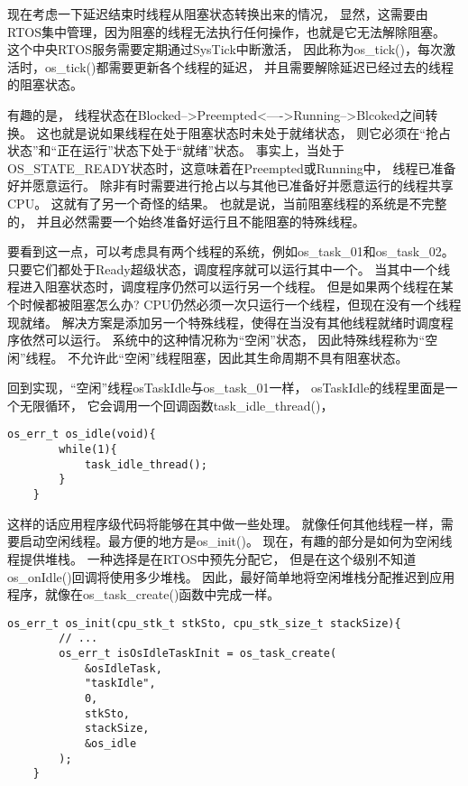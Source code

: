 现在考虑一下延迟结束时线程从阻塞状态转换出来的情况，
显然，这需要由RTOS集中管理，因为阻塞的线程无法执行任何操作，也就是它无法解除阻塞。
这个中央RTOS服务需要定期通过SysTick中断激活，
因此称为os\_tick()，每次激活时，os\_tick()都需要更新各个线程的延迟，
并且需要解除延迟已经过去的线程的阻塞状态。

有趣的是，
线程状态在Blocked-->Preempted<---->Running-->Blcoked之间转换。
这也就是说如果线程在处于阻塞状态时未处于就绪状态，
则它必须在“抢占状态”和“正在运行”状态下处于“就绪”状态。
事实上，当处于OS\_STATE\_READY状态时，这意味着在Preempted或Running中，
线程已准备好并愿意运行。
除非有时需要进行抢占以与其他已准备好并愿意运行的线程共享CPU。
这就有了另一个奇怪的结果。
也就是说，当前阻塞线程的系统是不完整的，
并且必然需要一个始终准备好运行且不能阻塞的特殊线程。

要看到这一点，可以考虑具有两个线程的系统，例如os\_task\_01和os\_task\_02。
只要它们都处于Ready超级状态，调度程序就可以运行其中一个。
当其中一个线程进入阻塞状态时，调度程序仍然可以运行另一个线程。
但是如果两个线程在某个时候都被阻塞怎么办? 
CPU仍然必须一次只运行一个线程，但现在没有一个线程现就绪。
解决方案是添加另一个特殊线程，使得在当没有其他线程就绪时调度程序依然可以运行。
系统中的这种情况称为“空闲”状态，
因此特殊线程称为“空闲”线程。
不允许此“空闲”线程阻塞，因此其生命周期不具有阻塞状态。

回到实现，“空闲”线程osTaskIdle与os\_task\_01一样，
osTaskIdle的线程里面是一个无限循环，
它会调用一个回调函数task\_idle\_thread()，
\begin{lstlisting}[language={[ANSI]C},keywordstyle=\color{blue!70},commentstyle=\color{red!50!green!50!blue!50},frame=shadowbox, rulesepcolor=\color{red!20!green!20!blue!20}]
    os_err_t os_idle(void){
	    while(1){
		    task_idle_thread();
	    }
    }
\end{lstlisting}
这样的话应用程序级代码将能够在其中做一些处理。
就像任何其他线程一样，需要启动空闲线程。最方便的地方是os\_init()。
现在，有趣的部分是如何为空闲线程提供堆栈。
一种选择是在RTOS中预先分配它，
但是在这个级别不知道os\_onIdle()回调将使用多少堆栈。
因此，最好简单地将空闲堆栈分配推迟到应用程序，就像在os\_task\_create()函数中完成一样。
\begin{lstlisting}[language={[ANSI]C},keywordstyle=\color{blue!70},commentstyle=\color{red!50!green!50!blue!50},frame=shadowbox, rulesepcolor=\color{red!20!green!20!blue!20}]
    os_err_t os_init(cpu_stk_t stkSto, cpu_stk_size_t stackSize){
        // ...
        os_err_t isOsIdleTaskInit = os_task_create(
            &osIdleTask,
            "taskIdle",
            0,
            stkSto,
            stackSize,
            &os_idle
        );
    }
\end{lstlisting}


